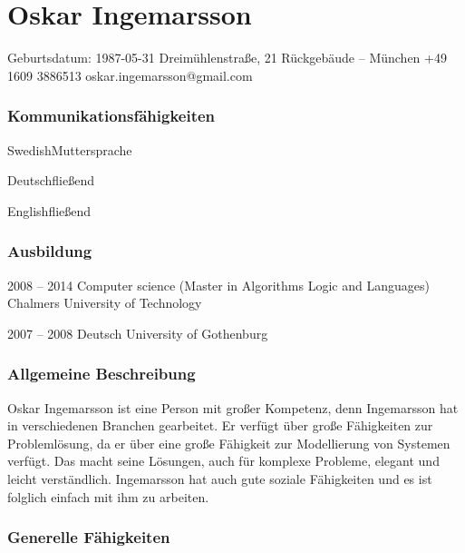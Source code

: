 \documentclass[fontsize=10pt]{tccv}
\begin{document}
\part{Oskar Ingemarsson}

\personal
    {Geburtsdatum: 1987-05-31}
    {Dreimühlenstra{\ss}e, 21 Rückgebäude -- München}
    {+49 1609 3886513}
    {oskar.ingemarsson@gmail.com}
    {}

\section{Kommunikationsfähigkeiten}

\begin{factlist}
\item{Swedish}{Muttersprache}
\item{Deutsch}{fließend}
\item{English}{fließend}

\end{factlist}

\section{Ausbildung}

\begin{yearlist}
\item{2008 -- 2014}
     {Computer science (Master in Algorithms Logic and Languages)}
     {Chalmers University of Technology}
\item{2007 -- 2008}
    {Deutsch}
    {University of Gothenburg}
\end{yearlist}

\section{Allgemeine Beschreibung}

Oskar Ingemarsson ist eine Person mit großer Kompetenz, denn Ingemarsson hat in
verschiedenen Branchen gearbeitet. Er verfügt über große Fähigkeiten zur
Problemlösung, da er über eine große Fähigkeit zur Modellierung von Systemen
verfügt. Das macht seine Lösungen, auch für komplexe Probleme, elegant und
leicht verständlich. Ingemarsson hat auch gute soziale
Fähigkeiten und es ist folglich einfach mit ihm zu arbeiten.

\section{Generelle Fähigkeiten}
\end{document}
